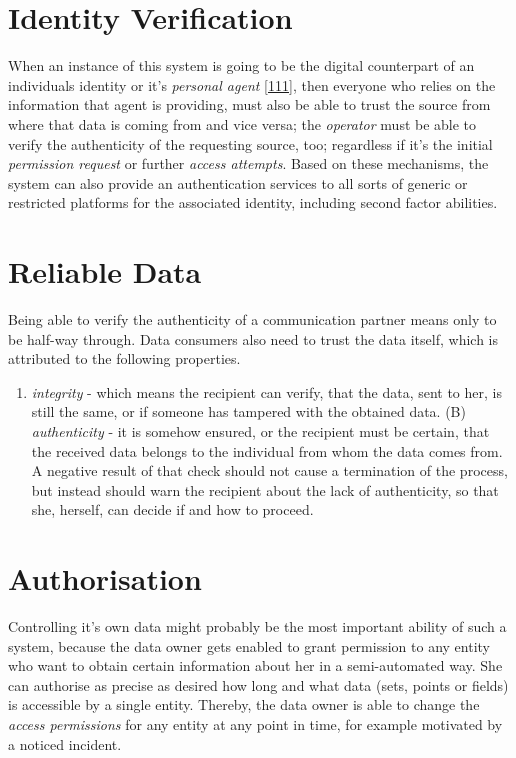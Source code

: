 \documentclass[12pt,english,a4paper,titlepage,cleardoublepage=empty,dottedtoc]{report}
\providecommand{\tightlist}{%
  \setlength{\itemsep}{0pt}\setlength{\parskip}{0pt}}
\begin{document}
\section{Identity Verification}\label{identity-verification}

When an instance of this system is going to be the digital counterpart
of an individuals identity or it's \emph{personal agent}
{[}\protect\hyperlink{ref-book_2015_ethical-it-innovation}{111}{]}, then
everyone who relies on the information that agent is providing, must
also be able to trust the source from where that data is coming from and
vice versa; the \emph{operator} must be able to verify the authenticity
of the requesting source, too; regardless if it's the initial
\emph{permission request} or further \emph{access attempts}. Based on
these mechanisms, the system can also provide an authentication services
to all sorts of generic or restricted platforms for the associated
identity, including second factor abilities.

\section{Reliable Data}\label{reliable-data}

Being able to verify the authenticity of a communication partner means
only to be half-way through. Data consumers also need to trust the data
itself, which is attributed to the following properties.

\begin{enumerate}
\def\labelenumi{(\Alph{enumi})}
\tightlist
\item
  \emph{integrity} - which means the recipient can verify, that the
  data, sent to her, is still the same, or if someone has tampered with
  the obtained data. (B) \emph{authenticity} - it is somehow ensured, or
  the recipient must be certain, that the received data belongs to the
  individual from whom the data comes from. A negative result of that
  check should not cause a termination of the process, but instead
  should warn the recipient about the lack of authenticity, so that she,
  herself, can decide if and how to proceed.
\end{enumerate}

\section{Authorisation}\label{authorisation}

Controlling it's own data might probably be the most important ability
of such a system, because the data owner gets enabled to grant
permission to any entity who want to obtain certain information about
her in a semi-automated way. She can authorise as precise as desired how
long and what data (sets, points or fields) is accessible by a single
entity. Thereby, the data owner is able to change the \emph{access
permissions} for any entity at any point in time, for example motivated
by a noticed incident.
\end{document}
